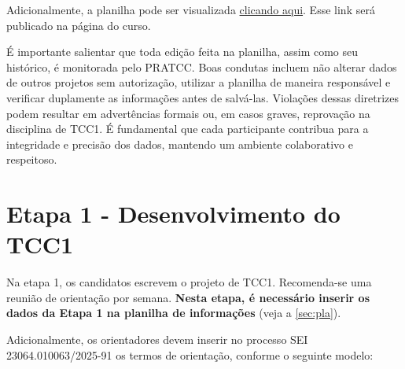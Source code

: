 \documentclass[a4paper, 12pt]{article}
\newcommand{\seiprocess}{23064.010063/2025-91} %
\begin{document}
	Adicionalmente, a planilha pode ser visualizada \href{https://docs.google.com/spreadsheets/d/e/2PACX-1vQKQ_bI1Ka_BKbx_LZkVxxYrV69ROWFWqE8V_niYUJP7EjumnNhUP65tGiUxh32qgDYW_WWdC5nJelJ/pubhtml}{clicando aqui}. Esse link será publicado na página do curso.

	É importante salientar que toda edição feita na planilha, assim como seu histórico, é monitorada pelo PRATCC. Boas condutas incluem não alterar dados de outros projetos sem autorização, utilizar a planilha de maneira responsável e verificar duplamente as informações antes de salvá-las. Violações dessas diretrizes podem resultar em advertências formais ou, em casos graves, reprovação na disciplina de TCC1. É fundamental que cada participante contribua para a integridade e precisão dos dados, mantendo um ambiente colaborativo e respeitoso.

	\section{Etapa 1 - Desenvolvimento do TCC1}
	\label{sec:et1}
	Na etapa 1, os candidatos escrevem o projeto de TCC1. Recomenda-se uma reunião de orientação por semana. \textbf{Nesta etapa, é necessário inserir os dados da Etapa 1 na planilha de informações} (veja a \autoref{sec:pla}).
	
	Adicionalmente, os orientadores devem inserir no processo SEI \seiprocess{} os termos de orientação, conforme o seguinte modelo:
\end{document}
